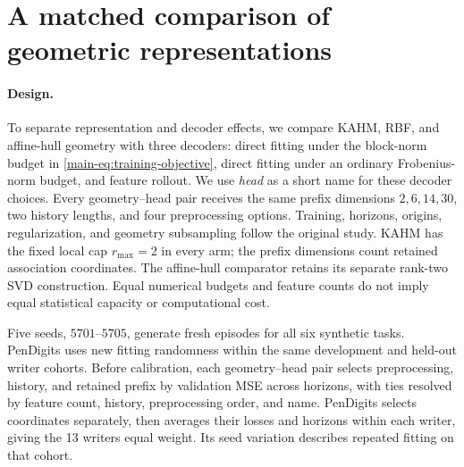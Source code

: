 \section{A matched comparison of geometric representations}
\label{sec:matched-geometry}
\newcommand{\MatchedCandidates}{13{,}440}
\newcommand{\MatchedComparisons}{42}
\newcommand{\MatchedImproved}{28}
\newcommand{\MatchedDegraded}{14}
\newcommand{\MatchedCalComparisons}{180}
\newcommand{\MatchedCalCertified}{1}


\paragraph{Design.}
To separate representation and decoder effects, we compare KAHM, RBF, and
affine-hull geometry with three decoders: direct fitting under the block-norm
budget in \eqref{main-eq:training-objective}, direct fitting under an ordinary
Frobenius-norm budget, and feature rollout. We use \emph{head} as a short name
for these decoder choices.
Every geometry--head pair receives the same prefix dimensions $2,6,14,30$,
two history lengths, and four preprocessing options. Training, horizons,
origins, regularization, and geometry subsampling follow the original study.
KAHM has the fixed local cap $r_{\max}=2$ in every arm; the prefix dimensions
count retained association coordinates. The affine-hull comparator retains
its separate rank-two SVD construction.
Equal numerical budgets and feature counts do not imply equal statistical
capacity or computational cost.

Five seeds, $5701$--$5705$, generate fresh episodes for all six synthetic
tasks. PenDigits uses new fitting randomness within the same development and
held-out writer cohorts. Before calibration, each geometry--head pair selects
preprocessing, history, and retained prefix by validation MSE across horizons, with
ties resolved by feature count, history, preprocessing order, and name.
PenDigits selects coordinates separately, then averages their losses and
horizons within each writer, giving the 13 writers equal weight. Its seed
variation describes repeated fitting on that cohort.

